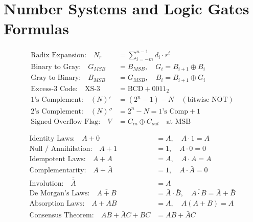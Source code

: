 \chapter{Number Systems and Logic Gates Formulas}

\begin{formulabox}
\begin{align}
\text{Radix Expansion:} \quad N_r &= \sum_{i=-m}^{n-1} d_i \cdot r^i \\
\text{Binary to Gray:} \quad G_{MSB} &= B_{MSB}, \quad G_i = B_{i+1} \oplus B_i \\
\text{Gray to Binary:} \quad B_{MSB} &= G_{MSB}, \quad B_i = B_{i+1} \oplus G_i \\
\text{Excess-3 Code:} \quad \text{XS-3} &= \text{BCD} + 0011_2 \\
\text{1's Complement:} \quad (N)' &= (2^n - 1) - N \quad (\text{bitwise NOT}) \\
\text{2's Complement:} \quad (N)'' &= 2^n - N = \text{1's Comp} + 1 \\
\text{Signed Overflow Flag:} \quad V &= C_{in} \oplus C_{out} \quad \text{at MSB}
\end{align}
\end{formulabox}

\begin{formulabox}
\begin{align}
\text{Identity Laws:} \quad A + 0 &= A, \quad A \cdot 1 = A \\
\text{Null / Annihilation:} \quad A + 1 &= 1, \quad A \cdot 0 = 0 \\
\text{Idempotent Laws:} \quad A + A &= A, \quad A \cdot A = A \\
\text{Complementarity:} \quad A + \bar{A} &= 1, \quad A \cdot \bar{A} = 0 \\
\text{Involution:} \quad \overline{\overline{A}} &= A \\
\text{De Morgan's Laws:} \quad \overline{A + B} &= \bar{A} \cdot \bar{B}, \quad \overline{A \cdot B} = \bar{A} + \bar{B} \\
\text{Absorption Laws:} \quad A + AB &= A, \quad A(A + B) = A \\
\text{Consensus Theorem:} \quad AB + \bar{A}C + BC &= AB + \bar{A}C
\end{align}
\end{formulabox}

